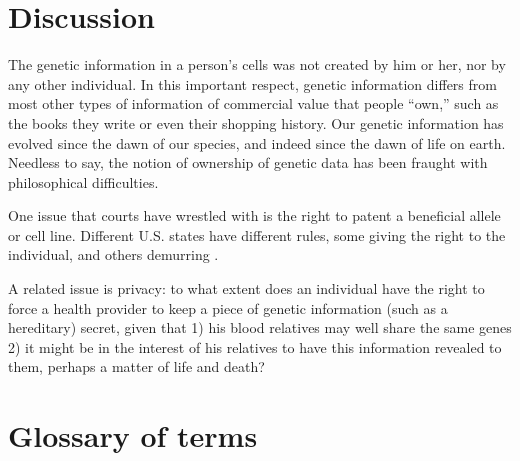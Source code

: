 \documentclass{article}
\begin{document}
\section{Discussion}
The genetic information in a person's cells was not created by him or her, nor by any other individual. In this important respect, genetic information differs from most other types of information of commercial value that people ``own,'' such as the books they write or even their shopping history. Our genetic information has evolved since the dawn of our species, and indeed since the dawn of life on earth. Needless to say, the notion of ownership of genetic data has been fraught with philosophical difficulties.

One issue that courts have wrestled with is the right to patent a beneficial allele or cell line. Different U.S. states have different rules, some giving the right to the individual, and others demurring \cite{john-moore-who-owns-your-genetic-information}.

A related issue is  privacy: to what extent does an individual have the right to force a health provider to keep a piece of genetic information (such as a hereditary) secret, given that 1) his blood relatives may well share the same genes 2) it might be in the interest of his relatives to have this information revealed to them, perhaps a matter of life and death?


\section{Glossary of terms}


\end{document}
